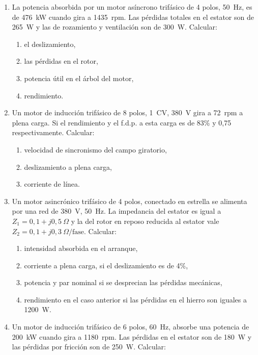 \documentclass[../main]{subfiles}
\begin{document}
\begin{enumerate}
  \item La potencia absorbida por un motor asíncrono trifásico de 4 polos, \qty{50}{Hz}, es de \qty{476}{kW} cuando gira a \qty{1435}{rpm}. Las pérdidas totales en el estator son de \qty{265}{W} y las de rozamiento y ventilación son de \qty{300}{W}. Calcular:
    \begin{enumerate}
      \item el deslizamiento,
      \item las pérdidas en el rotor,
      \item potencia útil en el árbol del motor,
      \item rendimiento.
    \end{enumerate}
  \item Un motor de inducción trifásico de 8 polos, \qty{1}{CV}, \qty{380}{V} gira a \qty{72}{rpm} a plena carga. Si el rendimiento y el f.d.p. a esta carga es de 83\% y 0,75 respectivamente. Calcular:
    \begin{enumerate}
      \item velocidad de sincronismo del campo giratorio,
      \item deslizamiento a plena carga,
      \item corriente de línea.
    \end{enumerate}
  \item Un motor asincrónico trifásico de 4 polos, conectado en estrella se alimenta por una red de \qty{380}{V}, \qty{50}{Hz}. La impedancia del estator es igual a $Z_1 = 0,1 + j0,5~\Omega$ y la del rotor en reposo reducida al estator vale $Z_2 = 0,1 + j0,3~\Omega/\text{fase}$. Calcular:
    \begin{enumerate}
      \item intensidad absorbida en el arranque,
      \item corriente a plena carga, si el deslizamiento es de 4\%,
      \item potencia y par nominal si se desprecian las pérdidas mecánicas,
      \item rendimiento en el caso anterior si las pérdidas en el hierro son iguales a \qty{1200}{W}.
    \end{enumerate}
  \item Un motor de inducción trifásico de 6 polos, \qty{60}{Hz}, absorbe una potencia de \qty{200}{kW} cuando gira a \qty{1180}{rpm}. Las pérdidas en el estator son de \qty{180}{W} y las pérdidas por fricción son de \qty{250}{W}. Calcular:

\end{enumerate}
\end{document}
